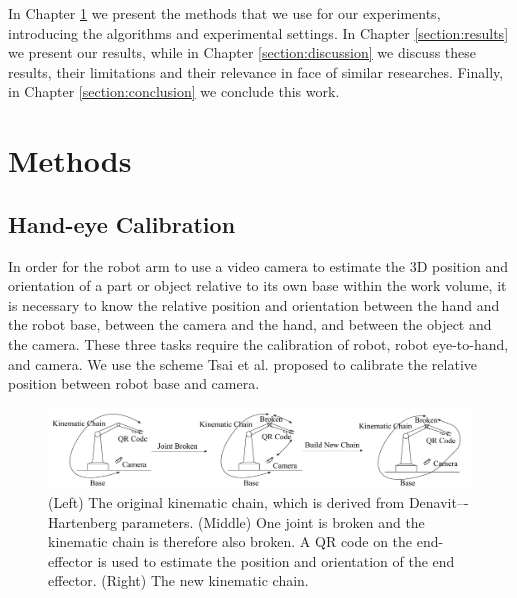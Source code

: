 \documentclass{ieeeaccess}
\begin{document}
In Chapter \ref{section:methods} we present the methods that we use for our experiments, introducing the algorithms and experimental settings. In Chapter \ref{section:results} we present our results, while in Chapter \ref{section:discussion} we discuss these results, their limitations and their relevance in face of similar researches. Finally, in Chapter \ref{section:conclusion} we conclude this work.
%
%
\section{Methods}
\label{section:methods}


\subsection{Hand-eye Calibration}
In order for the robot arm to use a video camera to estimate the 3D position and orientation of a part or object relative to its own base within the work volume, it is necessary to know the relative position and orientation between the hand and the robot base, between the camera and the hand, and between the object and the camera. These three tasks require the calibration of robot, robot eye-to-hand, and camera. We use the scheme Tsai et al. \cite{tsai1989new} proposed to calibrate the relative position between robot base and camera.

\begin{figure}[htpb!]
	\centering
	\includegraphics[width=1\textwidth]{img/f1.pdf}
	\caption{ (Left) The original kinematic chain, which is derived from Denavit–-Hartenberg parameters. (Middle) One joint is broken and the kinematic chain is therefore also broken. A QR code on the end-effector is used to estimate the position and orientation of the end effector. (Right) The new  kinematic chain.}
	\label{f1}
\end{figure}
\end{document}
